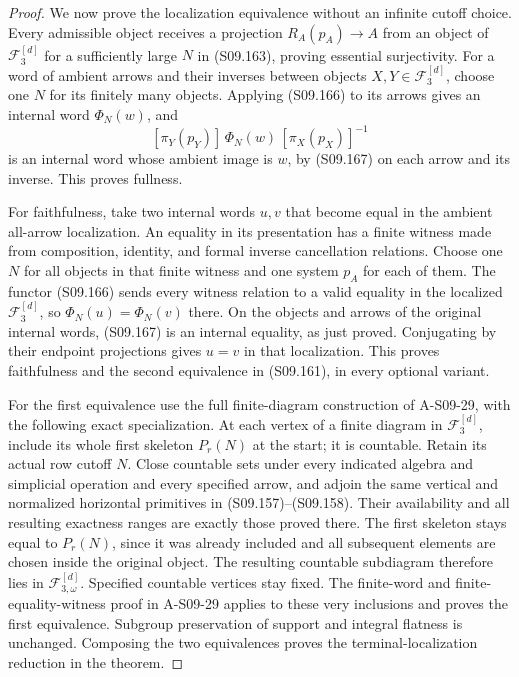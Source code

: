 \begin{proof}
We now prove the localization equivalence without an infinite
cutoff choice. Every admissible object receives a projection
$R_A(p_A)\to A$ from an object of $\mathcal F_3^{[d]}$
for a sufficiently large $N$ in (S09.163), proving essential
surjectivity. For a word of ambient arrows and their inverses
between objects $X,Y\in\mathcal F_3^{[d]}$, choose one $N$
for its finitely many objects. Applying (S09.166) to its
arrows gives an internal word $\Phi_N(w)$, and
\[
 [\pi_Y(p_Y)]\,\Phi_N(w)\,[\pi_X(p_X)]^{-1}
\]
is an internal word whose ambient image is $w$, by (S09.167)
on each arrow and its inverse. This proves fullness.

For faithfulness, take two internal words $u,v$ that become
equal in the ambient all-arrow localization. An equality in
its presentation has a finite witness made from composition,
identity, and formal inverse cancellation relations.
Choose one $N$ for all objects in that finite witness and one
system $p_A$ for each of them. The functor (S09.166) sends
every witness relation to a valid equality in the localized
$\mathcal F_3^{[d]}$, so $\Phi_N(u)=\Phi_N(v)$ there.
On the objects and arrows of the original internal words,
(S09.167) is an internal equality, as just proved.
Conjugating by their endpoint projections gives $u=v$
in that localization. This proves faithfulness and the
second equivalence in (S09.161), in every optional variant.

For the first equivalence use the full finite-diagram
construction of A-S09-29, with the following exact
specialization. At each vertex of a finite diagram in
$\mathcal F_3^{[d]}$, include its whole first skeleton
$P_r(N)$ at the start; it is countable. Retain its actual
row cutoff $N$. Close countable sets under every indicated
algebra and simplicial operation and every specified arrow,
and adjoin the same vertical and normalized horizontal
primitives in (S09.157)--(S09.158). Their availability and
all resulting exactness ranges are exactly those proved
there. The first skeleton stays equal to $P_r(N)$, since
it was already included and all subsequent elements are
chosen inside the original object. The resulting countable
subdiagram therefore lies in $\mathcal F_{3,\omega}^{[d]}$.
Specified countable vertices stay fixed. The finite-word
and finite-equality-witness proof in A-S09-29 applies to
these very inclusions and proves the first equivalence.
Subgroup preservation of support and integral flatness
is unchanged. Composing the two equivalences proves the
terminal-localization reduction in the theorem.


\end{proof}
